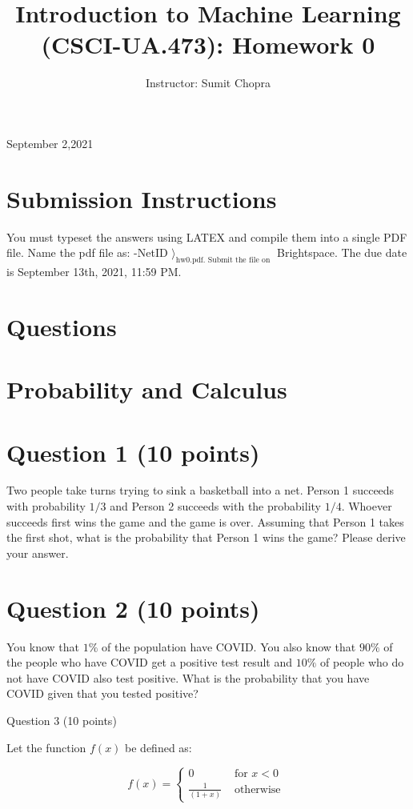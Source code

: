 \title{
Introduction to Machine Learning (CSCI-UA.473): Homework 0
}

\author{
Instructor: Sumit Chopra
}

September 2,2021

\section{Submission Instructions}

You must typeset the answers using LATEX and compile them into a single PDF file. Name the pdf file as: \langleYour-NetID $\rangle_{\text {hw0.pdf. Submit the file on }}$ Brightspace. The due date is September 13th, 2021, 11:59 PM.

\section{Questions}

\section{Probability and Calculus}

\section{Question 1 (10 points)}

Two people take turns trying to sink a basketball into a net. Person 1 succeeds with probability $1 / 3$ and Person 2 succeeds with the probability $1 / 4$. Whoever succeeds first wins the game and the game is over. Assuming that Person 1 takes the first shot, what is the probability that Person 1 wins the game? Please derive your answer.

\section{Question 2 (10 points)}

You know that $1 \%$ of the population have COVID. You also know that $90 \%$ of the people who have COVID get a positive test result and $10 \%$ of people who do not have COVID also test positive. What is the probability that you have COVID given that you tested positive?

Question 3 (10 points)

Let the function $f(x)$ be defined as:

$$
f(x)=\left\{\begin{array}{cl}
0 & \text { for } x<0 \\
\frac{1}{(1+x)} & \text { otherwise }
\end{array}\right.
$$

